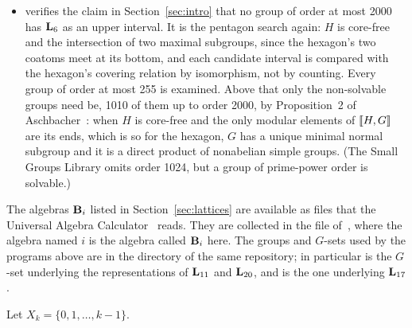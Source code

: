 {\begin{itemize}
groups themselves, of orders $60^{2160} \cdot 129600$ and
$60^{120} \cdot 7200$, are never built.  By a theorem of Aschbacher, in the
form \Palfy states it in~\cite{Palfy:2009}, the interval $\lb H, HU\rb$ is
dual to the poset of extensions of the twisting map $\alpha$ to subgroups
between the diagonal $A_5$ and $H$, with a top added, and an extension is
determined by its kernel; the program enumerates those extensions,
constructing each as a homomorphism, and compares the poset with the
hexagon's covering relation.
\item
{} verifies the claim in Section~\ref{sec:intro} that
no group of order at most 2000 has $\mathbf{L}_6$ as an upper interval.  It is
the pentagon search again: $H$ is core-free and the intersection of two
maximal subgroups, since the hexagon's two coatoms meet at its bottom, and
each candidate interval is compared with the hexagon's covering relation
by isomorphism, not by counting.  Every group of order at most 255 is
examined.  Above that only the non-solvable groups need be, 1010 of them
up to order 2000, by Proposition~2 of Aschbacher~\cite{Aschbacher2008}:
when $H$ is core-free and the only modular elements of $\llbracket H, G\rrbracket$ are
its ends, which is so for the hexagon, $G$ has a unique minimal normal
subgroup and it is a direct product of nonabelian simple groups.  (The
Small Groups Library omits order 1024, but a group of prime-power order is
solvable.)
\end{itemize}

The algebras $\mathbf{B}_i$ listed in Section~\ref{sec:lattices} are available
as files that the Universal Algebra Calculator~\cite{UACalc} reads.  They
are collected in the file 
of~\cite{AlgebraFiles}, where the algebra named $i$ is the
algebra called $\mathbf{B}_i$ here.  The groups and $G$-sets used by the
programs above are in the  directory of the same repository;
in particular  is the $G$-set
underlying the representations of $\mathbf{L}_{11}$ and $\mathbf{L}_{20}$, and
 is the one underlying $\mathbf{L}_{17}$.


Let $X_k = \{0, 1, \ldots, k-1\}$.


}
